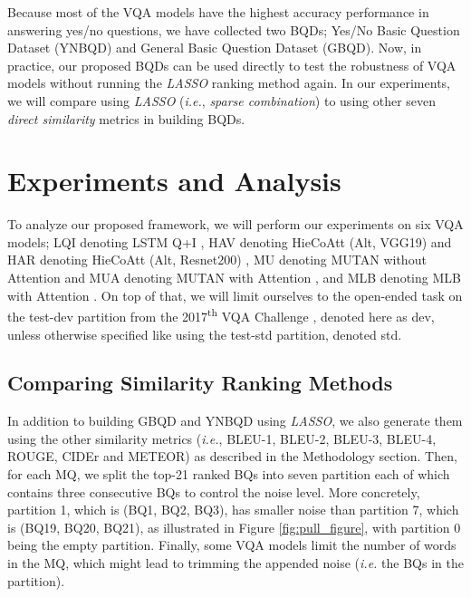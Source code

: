\documentclass[letterpaper]{article}
\newcommand{\ie}{}\def\ie/{{\em i.e.}}
\newcommand{\up}{}\def\up{\textsuperscript}
\newcommand{\lasso}{}\def\lasso/{\textit{LASSO}}
\begin{document}
Because most of the VQA models have the highest accuracy performance in answering yes/no questions, we have collected two BQDs; Yes/No Basic Question Dataset (YNBQD) and General Basic Question Dataset (GBQD). Now, in practice, our proposed BQDs can be used directly to test the robustness of VQA models without running the \lasso/ ranking method again. In our experiments, we will compare using \lasso/ (\ie/, \emph{sparse combination}) to using other seven \emph{direct similarity} metrics in building BQDs.

\section{Experiments and Analysis}
To analyze our proposed framework, we will perform our experiments on six VQA models; LQI denoting LSTM Q+I \cite{4}, HAV denoting HieCoAtt (Alt, VGG19) and HAR denoting HieCoAtt (Alt, Resnet200) \cite{41}, MU denoting MUTAN without Attention and MUA denoting MUTAN with Attention \cite{57}, and MLB denoting MLB with Attention \cite{4}. On top of that, we will limit ourselves to the open-ended task on the test-dev partition from the 2017\up{th} VQA Challenge \cite{4}, denoted here as dev, unless otherwise specified like using the test-std partition, denoted std.

\subsection{Comparing Similarity Ranking Methods}
In addition to building GBQD and YNBQD using \lasso/, we also generate them using the other similarity metrics (\ie/, BLEU-1, BLEU-2, BLEU-3, BLEU-4, ROUGE, CIDEr and METEOR) as described in the Methodology section. Then, for each MQ, we split the top-21 ranked BQs into seven partition each of which contains three consecutive BQs to control the noise level. More concretely, partition 1, which is (BQ1, BQ2, BQ3), has smaller noise than partition 7, which is (BQ19, BQ20, BQ21), as illustrated in Figure \ref{fig:pull_figure}, with partition 0 being the empty partition. Finally, some VQA models limit the number of words in the MQ, which might lead to trimming the appended noise (\ie/ the BQs in the partition).
\end{document}

